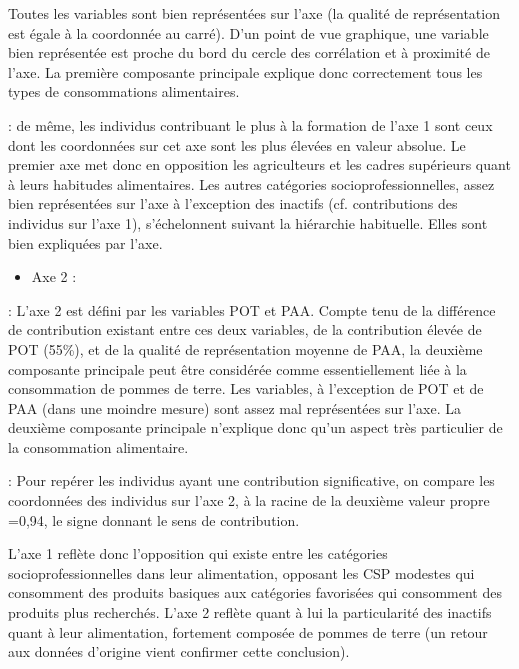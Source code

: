 \documentclass[letterpaper,10pt,english]{jupyterBook}
\begin{document}
\sphinxAtStartPar
Toutes les variables sont bien représentées sur l’axe (la qualité de représentation est égale à la coordonnée au carré). D’un point de vue graphique, une variable bien représentée est proche du bord du cercle des corrélation et à proximité de l’axe. La première composante principale explique donc correctement tous les types de consommations alimentaires.

\sphinxhyphen{}  : de même, les individus contribuant le plus à la formation de l’axe 1 sont ceux dont les coordonnées sur cet axe sont les plus élevées en valeur absolue. Le premier axe met donc en opposition les agriculteurs et les cadres supérieurs quant à leurs habitudes alimentaires. Les autres catégories socio\sphinxhyphen{}professionnelles, assez bien représentées sur l’axe à l’exception des inactifs (cf. contributions des individus sur l’axe 1), s’échelonnent suivant la hiérarchie habituelle. Elles sont bien expliquées par l’axe.
\begin{itemize}
\item {} 
\sphinxAtStartPar
Axe 2 :

\end{itemize}

\sphinxhyphen{}  : L’axe 2 est défini par les variables POT et PAA. Compte tenu de la différence de contribution existant entre ces deux variables, de la contribution élevée de POT (55\%), et de la qualité de représentation moyenne de PAA, la deuxième composante principale peut être considérée comme essentiellement liée à la consommation de pommes de terre. Les variables, à l’exception de POT et de PAA (dans une moindre mesure) sont assez mal représentées sur l’axe. La deuxième composante principale n’explique donc qu’un aspect très particulier de la consommation alimentaire.

\sphinxhyphen{}  : Pour repérer les individus ayant une contribution significative, on compare les coordonnées des individus sur l’axe 2, à la racine de la deuxième valeur propre  =0,94, le signe donnant le sens de contribution.

\sphinxAtStartPar
L’axe 1 reflète donc l’opposition qui existe entre les catégories socio\sphinxhyphen{}professionnelles dans leur alimentation, opposant les CSP modestes qui consomment des produits basiques aux catégories favorisées qui consomment des produits plus recherchés. L’axe 2 reflète quant à lui la particularité des inactifs quant à leur alimentation, fortement composée de pommes de terre (un retour aux données d’origine vient confirmer cette conclusion).
\end{document}
